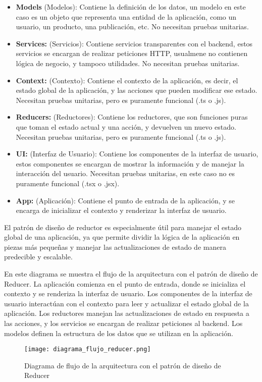 \documentclass[executivepaper]{article}
\begin{document}
\begin{itemize}
  \item \textbf{Models} (Modelos): Contiene la definición de los datos, un modelo en este caso es un objeto que representa una entidad de la aplicación, como un usuario, un producto, una publicación, etc. No necesitan pruebas unitarias.
  \item \textbf{Services:} (Servicios): Contiene servicios transparentes con el backend, estos servicios se encargan de realizar peticiones HTTP, usualmene no contienen lógica de negocio, y tampoco utilidades. No necesitan pruebas unitarias.
  \item \textbf{Context:} (Contexto): Contiene el contexto de la aplicación, es decir, el estado global de la aplicación, y las acciones que pueden modificar ese estado. Necesitan pruebas unitarias, pero es puramente funcional (.ts o .js).
  \item \textbf{Reducers:} (Reductores): Contiene los reductores, que son funciones puras que toman el estado actual y una acción, y devuelven un nuevo estado. Necesitan pruebas unitarias, pero es puramente funcional (.ts o .js).
  \item \textbf{UI:} (Interfaz de Usuario): Contiene los componentes de la interfaz de usuario, estos componentes se encargan de mostrar la información y de manejar la interacción del usuario. Necesitan pruebas unitarias, en este caso no es puramente funcional (.tsx o .jsx).
  \item \textbf{App:} (Aplicación): Contiene el punto de entrada de la aplicación, y se encarga de inicializar el contexto y renderizar la interfaz de usuario.
\end{itemize}

El patrón de diseño de reductor es especialmente útil para manejar el estado global de una aplicación, ya que permite dividir la lógica de la aplicación en piezas más pequeñas y manejar las actualizaciones de estado de manera predecible y escalable.

\newpage
En este diagrama se muestra el flujo de la arquitectura con el patrón de diseño de Reducer. La aplicación comienza en el punto de entrada, donde se inicializa el contexto y se renderiza la interfaz de usuario. Los componentes de la interfaz de usuario interactúan con el contexto para leer y actualizar el estado global de la aplicación. Los reductores manejan las actualizaciones de estado en respuesta a las acciones, y los servicios se encargan de realizar peticiones al backend. Los modelos definen la estructura de los datos que se utilizan en la aplicación.

\begin{figure}
  \begin{center}
    \texttt{[image: diagrama\_flujo\_reducer.png]}
    \caption{Diagrama de flujo de la arquitectura con el patrón de diseño de Reducer}
  \end{center}
\end{figure}
\end{document}
